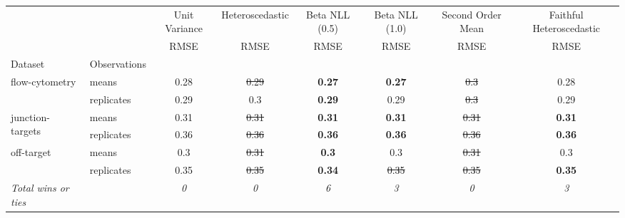 \begin{tabular}{ll|c|c|c|c|c|c}
\toprule
{} & {} & {Unit Variance} & {Heteroscedastic} & {Beta NLL (0.5)} & {Beta NLL (1.0)} & {Second Order Mean} & {Faithful Heteroscedastic} \\
{} & {} & {RMSE} & {RMSE} & {RMSE} & {RMSE} & {RMSE} & {RMSE} \\
{Dataset} & {Observations} & {} & {} & {} & {} & {} & {} \\
\midrule
\multirow[t]{2}{*}{flow-cytometry} & means & 0.28 & \sout{0.29} & \textbf{0.27} & \textbf{0.27} & \sout{0.3} & 0.28 \\
 & replicates & 0.29 & 0.3 & \textbf{0.29} & 0.29 & \sout{0.3} & 0.29 \\
\multirow[t]{2}{*}{junction-targets} & means & 0.31 & \sout{0.31} & \textbf{0.31} & \textbf{0.31} & \sout{0.31} & \textbf{0.31} \\
 & replicates & 0.36 & \sout{0.36} & \textbf{0.36} & \textbf{0.36} & \sout{0.36} & \textbf{0.36} \\
\multirow[t]{2}{*}{off-target} & means & 0.3 & \sout{0.31} & \textbf{0.3} & 0.3 & \sout{0.31} & 0.3 \\
 & replicates & 0.35 & \sout{0.35} & \textbf{0.34} & \sout{0.35} & \sout{0.35} & \textbf{0.35} \\
\textit{{Total wins or ties}} &  & \textit{0} & \textit{0} & \textit{6} & \textit{3} & \textit{0} & \textit{3} \\
\bottomrule
\end{tabular}
